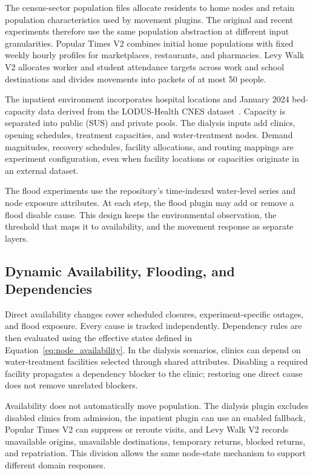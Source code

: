 \documentclass[pdflatex,sn-mathphys-num]{sn-jnl}%
\theoremstyle{thmstyleone}%
\theoremstyle{thmstyletwo}%
\theoremstyle{thmstylethree}%
\begin{document}
The census-sector population files allocate residents to home nodes and retain population characteristics used by movement plugins. The original and recent experiments therefore use the same population abstraction at different input granularities. Popular Times V2 combines initial home populations with fixed weekly hourly profiles for marketplaces, restaurants, and pharmacies. Levy Walk V2 allocates worker and student attendance targets across work and school destinations and divides movements into packets of at most 50 people.

The inpatient environment incorporates hospital locations and January 2024 bed-capacity data derived from the LODUS-Health CNES dataset~\citep{souza2026lodushealth}. Capacity is separated into public (SUS) and private pools. The dialysis inputs add clinics, opening schedules, treatment capacities, and water-treatment nodes. Demand magnitudes, recovery schedules, facility allocations, and routing mappings are experiment configuration, even when facility locations or capacities originate in an external dataset.

The flood experiments use the repository's time-indexed water-level series and node exposure attributes. At each step, the flood plugin may add or remove a flood disable cause. This design keeps the environmental observation, the threshold that maps it to availability, and the movement response as separate layers.

\subsection{Dynamic Availability, Flooding, and Dependencies}

Direct availability changes cover scheduled closures, experiment-specific outages, and flood exposure. Every cause is tracked independently. Dependency rules are then evaluated using the effective states defined in Equation~\ref{eq:node_availability}. In the dialysis scenarios, clinics can depend on water-treatment facilities selected through shared attributes. Disabling a required facility propagates a dependency blocker to the clinic; restoring one direct cause does not remove unrelated blockers.

Availability does not automatically move population. The dialysis plugin excludes disabled clinics from admission, the inpatient plugin can use an enabled fallback, Popular Times V2 can suppress or reroute visits, and Levy Walk V2 records unavailable origins, unavailable destinations, temporary returns, blocked returns, and repatriation. This division allows the same node-state mechanism to support different domain responses.
\end{document}
